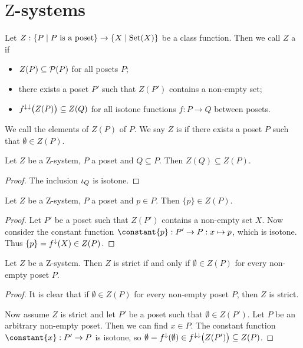 \section{$\mathrm{Z}$-systems}
\begin{definition}
Let $Z: \setbuilder{P}{\text{$P$ is a poset}} \to \setbuilder{X}{\Set(X)}$ be a class function. Then we call $Z$ a  if
\begin{itemize}
\item $Z(P) \subseteq \operatorname{\mathcal{P}}(P)$ for all posets $P$;
\item there exists a poset $P'$ such that $Z(P')$ contains a non-empty set;
\item $f^{\downarrow\downarrow}\big(Z(P)\big) \subseteq Z(Q)$ for all isotone functions $f: P\to Q$ between posets.
\end{itemize}
We call the elements of $Z(P)$  of $P$. We say $Z$ is  if there exists a poset $P$ such that $\emptyset \in Z(P)$.
\end{definition}

\begin{lemma} \label{subsetZsets}
Let $Z$ be a $\mathrm{Z}$-system, $P$ a poset and $Q\subseteq P$. Then $Z(Q) \subseteq Z(P)$.
\end{lemma}
\begin{proof}
The inclusion $\operatorname{\iota}_Q$ is isotone.
\end{proof}

\begin{lemma} \label{singletonsAreZSets}
Let $Z$ be a $\mathrm{Z}$-system, $P$ a poset and $p\in P$. Then $\{p\} \in Z(P)$.
\end{lemma}
\begin{proof}
Let $P'$ be a poset such that $Z(P')$ contains a non-empty set $X$. Now consider the constant function $\constant{p}: P'\to P: x\mapsto p$, which is isotone. Thus $\{p\} = f^\downarrow(X) \in Z(P)$.
\end{proof}

\begin{lemma} \label{strictZSystemEveryEmptySetZSet}
Let $Z$ be a $\mathrm{Z}$-system. Then $Z$ is strict \textup{if and only if} $\emptyset \in Z(P)$ for every non-empty poset $P$.
\end{lemma}
\begin{proof}
It is clear that if $\emptyset \in Z(P)$ for every non-empty poset $P$, then $Z$ is strict.

Now assume $Z$ is strict and let $P'$ be a poset such that $\emptyset\in Z(P')$. Let $P$ be an arbitrary non-empty poset. Then we can find $x\in P$. The constant function $\constant{x}: P'\to P$ is isotone, so $\emptyset = f^\downarrow(\emptyset) \in f^{\downarrow\downarrow}\big(Z(P')\big) \subseteq Z(P)$.
\end{proof}

